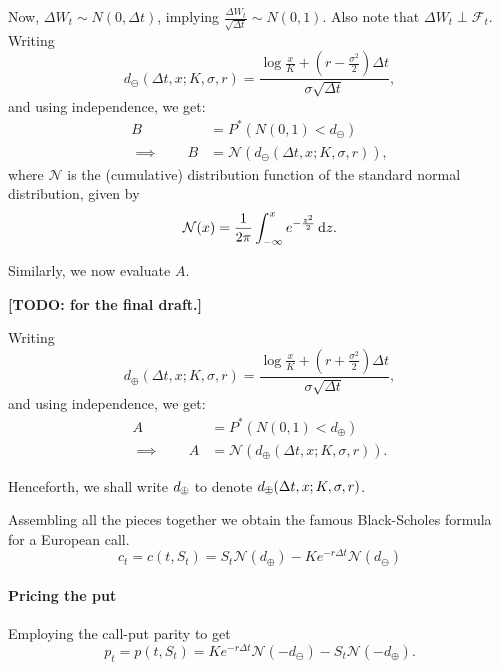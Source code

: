 Now, $ \Delta W_t \sim N(0, \Delta t) $, implying $ \frac{ \Delta W_t }{ \sqrt{\Delta t} } \sim N(0, 1) $. Also note that $ \Delta W_t \perp \mathcal{F}_t $. Writing 
\begin{equation*}
	d_{\ominus} ( \Delta t, x; K, \sigma, r ) = \frac{ \log \frac{x}{K} + ( r - \frac{\sigma^2}{2} ) \Delta t }{ \sigma \sqrt{\Delta t} } ,
\end{equation*}
and using independence, we get:
\begin{align*}
	B  &=  P^* \left( N(0, 1)  <  d_{\ominus} \right)  \\
	\implies  \qquad  B  &=  \mathcal{N}(d_{\ominus} ( \Delta t, x; K, \sigma, r )),
\end{align*}
where $ \mathcal{N} $ is the (cumulative) distribution function of the standard normal distribution, given by
\begin{equation}
	\mathcal{N}(x) = \frac{1}{2 \pi} \int_{- \infty}^{x} e^{-\frac{z^2}{2}} \dif z .
\end{equation}


Similarly, we now evaluate $ A $.

\textbf{[TODO: for the final draft.]}

Writing 
\begin{equation*}
d_{\oplus} ( \Delta t, x; K, \sigma, r ) = \frac{ \log \frac{x}{K} + ( r + \frac{\sigma^2}{2} ) \Delta t }{ \sigma \sqrt{\Delta t} } ,
\end{equation*}
and using independence, we get:
\begin{align*}
A  &=  P^* \left( N(0, 1)  <  d_{\oplus} \right)  \\
\implies  \qquad  A  &=  \mathcal{N}(d_{\oplus} ( \Delta t, x; K, \sigma, r )).
\end{align*}

Henceforth, we shall write $ d_{\opm} $ to denote $ d_{\opm} ( \Delta t, x; K, \sigma, r ) $.

Assembling all the pieces together we obtain the famous Black-Scholes formula for a European call.
\begin{equation}
	\label{eq:continous-call-pr}
	c_t = c(t, S_t) = S_t \mathcal{N}(d_{\oplus}) - K e^{-r \Delta t} \mathcal{N}(d_{\ominus})
\end{equation}


\paragraph{Pricing the put}
Employing the call-put parity to get
\begin{equation}
	\label{eq:continous-put-pr}
	p_t = p(t, S_t) = K e^{-r \Delta t} \mathcal{N}(- d_{\ominus}) - S_t \mathcal{N}(- d_{\oplus}).
\end{equation}


